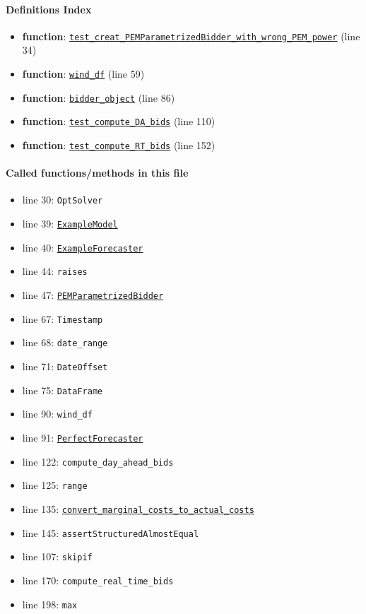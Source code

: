 \documentclass[11pt]{report}
\begin{document}
\paragraph{Definitions Index}
\begin{itemize}[leftmargin=*]
  \item \textbf{function}: \hyperref[def:tests-test_PEM_Parameterized_bidder.py:test_creat_PEMParametrizedBidder_with_wrong_PEM_power:L34]{\texttt{test\_creat\_PEMParametrizedBidder\_with\_wrong\_PEM\_power}} (line 34)
  \item \textbf{function}: \hyperref[def:tests-test_PEM_Parameterized_bidder.py:wind_df:L59]{\texttt{wind\_df}} (line 59)
  \item \textbf{function}: \hyperref[def:tests-test_PEM_Parameterized_bidder.py:bidder_object:L86]{\texttt{bidder\_object}} (line 86)
  \item \textbf{function}: \hyperref[def:tests-test_PEM_Parameterized_bidder.py:test_compute_DA_bids:L110]{\texttt{test\_compute\_DA\_bids}} (line 110)
  \item \textbf{function}: \hyperref[def:tests-test_PEM_Parameterized_bidder.py:test_compute_RT_bids:L152]{\texttt{test\_compute\_RT\_bids}} (line 152)
\end{itemize}
\paragraph{Called functions/methods in this file}
\begin{itemize}[leftmargin=*]
  \item line 30: \texttt{OptSolver}
  \item line 39: \hyperref[def:tests-util.py:ExampleModel:L25]{\texttt{ExampleModel}}
  \item line 40: \hyperref[def:tests-util.py:ExampleForecaster:L259]{\texttt{ExampleForecaster}}
  \item line 44: \texttt{raises}
  \item line 47: \hyperref[def:bidder.py:PEMParametrizedBidder:L1502]{\texttt{PEMParametrizedBidder}}
  \item line 67: \texttt{Timestamp}
  \item line 68: \texttt{date\_range}
  \item line 71: \texttt{DateOffset}
  \item line 75: \texttt{DataFrame}
  \item line 90: \texttt{wind\_df}
  \item line 91: \hyperref[def:forecaster.py:PerfectForecaster:L686]{\texttt{PerfectForecaster}}
  \item line 122: \texttt{compute\_day\_ahead\_bids}
  \item line 125: \texttt{range}
  \item line 135: \hyperref[def:utils.py:convert_marginal_costs_to_actual_costs:L15]{\texttt{convert\_marginal\_costs\_to\_actual\_costs}}
  \item line 145: \texttt{assertStructuredAlmostEqual}
  \item line 107: \texttt{skipif}
  \item line 170: \texttt{compute\_real\_time\_bids}
  \item line 198: \texttt{max}
\end{itemize}
\end{document}
